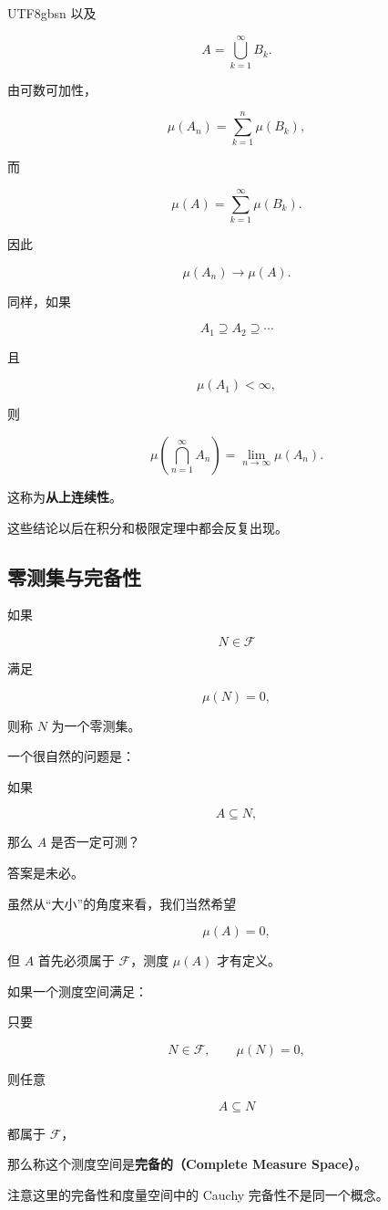 \documentclass[11pt]{article}
\begin{document}
\begin{CJK*}{UTF8}{gbsn}
以及

\[
A=\bigcup_{k=1}^{\infty}B_{k}.
\]

由可数可加性，

\[
\mu(A_{n})=\sum_{k=1}^{n}\mu(B_{k}),
\]

而

\[
\mu(A)=\sum_{k=1}^{\infty}\mu(B_{k}).
\]

因此

\[
\mu(A_{n})\rightarrow\mu(A).
\]

同样，如果

\[
A_{1}\supseteq A_{2}\supseteq\cdots
\]

且

\[
\mu(A_{1})<\infty,
\]

则

\[
\mu\left(\bigcap_{n=1}^{\infty}A_{n}\right)=\lim_{n\to\infty}\mu(A_{n}).
\]

这称为\textbf{从上连续性}。

这些结论以后在积分和极限定理中都会反复出现。

\subsection{零测集与完备性}

如果

\[
N\in\mathcal{F}
\]

满足

\[
\mu(N)=0,
\]

则称 $N$ 为一个零测集。

一个很自然的问题是：

如果

\[
A\subseteq N,
\]

那么 $A$ 是否一定可测？

答案是未必。

虽然从“大小”的角度来看，我们当然希望

\[
\mu(A)=0,
\]

但 $A$ 首先必须属于 $\mathcal{F}$，测度 $\mu(A)$ 才有定义。

如果一个测度空间满足：

只要

\[
N\in\mathcal{F},\qquad\mu(N)=0,
\]

则任意

\[
A\subseteq N
\]

都属于 $\mathcal{F}$，

那么称这个测度空间是\textbf{完备的（Complete Measure Space）}。

注意这里的完备性和度量空间中的 Cauchy 完备性不是同一个概念。


\end{CJK*}
\end{document}
